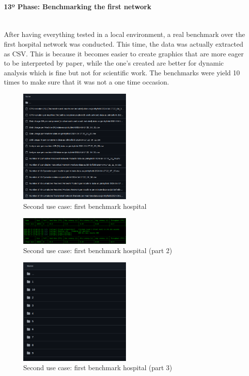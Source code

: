 \paragraph{13º Phase: Benchmarking the first network}\mbox{}\\
After having everything tested in a local environment, a real benchmark over the first hospital network was conducted. This time, the data was actually extracted as CSV. This is because it becomes easier to create graphics that are more eager to be interpreted by paper, while the one's created are better for dynamic analysis which is fine but not for scientific work. The benchmarks were yield 10 times to make sure that it was not a one time occasion.
\begin{figure}[H]
    \centering
    \includegraphics[width=0.5\textwidth]{assets/use-case-2/first-benchmarking-hospital.png} %
    \caption{Second use case: first benchmark hospital}
    \label{fig:sample-image} 
\end{figure}

\begin{figure}[H]
    \centering
    \includegraphics[width=0.5\textwidth]{assets/use-case-2/first-benchmarking-hospital2.png} %
    \caption{Second use case: first benchmark hospital (part 2)}
    \label{fig:sample-image} 
\end{figure}

\begin{figure}[H]
    \centering
    \includegraphics[width=0.5\textwidth]{assets/use-case-2/first-benchmarking-hospital3.png} %
    \caption{Second use case: first benchmark hospital (part 3)}
    \label{fig:sample-image} 
\end{figure}
